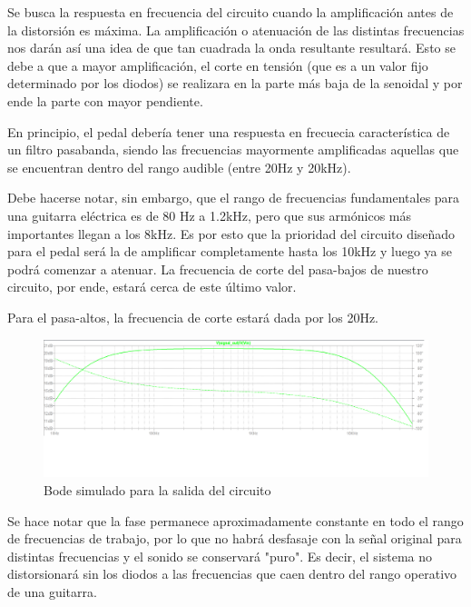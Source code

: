 \documentclass[../../main.tex]{subfiles}
\begin{document}
Se busca la respuesta en frecuencia del circuito cuando la amplificación antes de la distorsión es máxima. La amplificación o atenuación de las distintas frecuencias nos darán así una idea de que tan cuadrada la onda resultante resultará. Esto se debe a que a mayor amplificación, el corte en tensión (que es a un valor fijo determinado por los diodos) se realizara en la parte más baja de la senoidal y por ende la parte con mayor pendiente. \par
En principio, el pedal debería tener una respuesta en frecuecia característica de un filtro pasabanda, siendo las frecuencias mayormente amplificadas aquellas que se encuentran dentro del rango audible (entre 20Hz y 20kHz).\par
Debe hacerse notar, sin embargo, que el rango de frecuencias fundamentales para una guitarra eléctrica es de 80 Hz a 1.2kHz, pero que sus armónicos más importantes llegan a los 8kHz. Es por esto que la prioridad del circuito diseñado para el pedal será la de amplificar completamente hasta los 10kHz y luego ya se podrá comenzar a atenuar. La frecuencia de corte del pasa-bajos de nuestro circuito, por ende, estará cerca de este último valor.\par
Para el pasa-altos, la frecuencia de corte estará dada por los 20Hz.

\begin{figure}[H]
	\includegraphics[scale=.4]{imagenes/Bode_simulacion.png}
	\caption{Bode simulado para la salida del circuito}
	\label{fig:ej5_Bode_simulacion}
\end{figure}
 
Se hace notar que la fase permanece aproximadamente constante en todo el rango de frecuencias de trabajo, por lo que no habrá desfasaje con la señal original para distintas frecuencias y el sonido se conservará "puro". Es decir, el sistema no distorsionará sin los diodos a las frecuencias que caen dentro del rango operativo de una guitarra.\par
\end{document}
